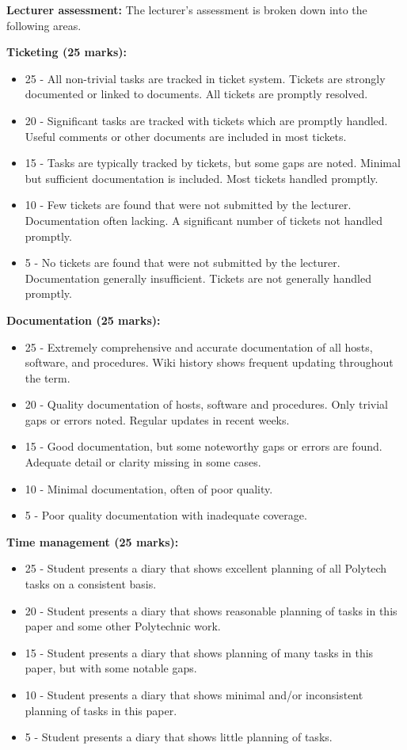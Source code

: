 \documentclass{article}   	%
\begin{document}
\vskip 5mm

\textbf{Lecturer assessment:} The lecturer's assessment is broken down into the following areas.

\textbf{Ticketing (25 marks):}
\begin{itemize}
  \item 25 - All non-trivial tasks are tracked in ticket system. Tickets are strongly documented or linked to documents.  All tickets are promptly resolved.
  \item 20 - Significant tasks are tracked with tickets which are promptly handled.  Useful comments or other documents are included in most tickets.
  \item 15 - Tasks are typically tracked by tickets, but some gaps are noted.  Minimal but sufficient documentation is included.  Most tickets handled promptly.
  \item 10 - Few tickets are found that were not submitted by the lecturer.  Documentation often lacking.  A significant number of tickets not handled promptly.
  \item 5 - No tickets are found that were not submitted by the lecturer.  Documentation generally insufficient.  Tickets are not generally handled promptly.
\end{itemize}

\newpage

\textbf{Documentation (25 marks):}
\begin{itemize}
  \item 25 - Extremely comprehensive and accurate documentation of all hosts, software, and procedures.  Wiki history shows frequent updating throughout the term.
  \item 20 - Quality documentation of hosts, software and procedures.  Only trivial gaps or errors noted.   Regular updates in recent weeks.
  \item 15 - Good documentation, but some noteworthy gaps or errors are found.  Adequate detail or clarity missing in some cases.
  \item 10 - Minimal documentation, often of poor quality.
  \item 5 -  Poor quality documentation with inadequate coverage.
\end{itemize}

\textbf{Time management (25 marks):}
\begin{itemize}
  \item 25 - Student presents a diary that shows excellent planning of all Polytech tasks on a consistent basis.
  \item 20 - Student presents a diary that shows reasonable planning of tasks in this paper and some other Polytechnic work.
  \item 15 - Student presents a diary that shows planning of many tasks in this paper, but with some notable gaps.
  \item 10 - Student presents a diary that shows minimal and/or inconsistent planning of tasks in this paper.
  \item 5 -  Student presents a diary that shows little planning of tasks.
\end{itemize}
\end{document}
